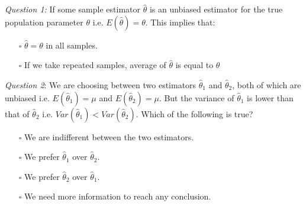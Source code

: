 \documentclass{./../../Latex/handout}
\begin{document}
\thispagestyle{plain}

 \\~\\

\textit{Question 1:} If some sample estimator $\hat{\theta}$ is an unbiased estimator for the true population parameter $\theta$ i.e. $E(\hat{\theta}) = \theta$. This implies that: \vspace{-1em}
\begin{itemize}
\item[$\square$] $\hat{\theta}=\theta$ in all samples.
\item[$\square$] If we take repeated samples, average of $\hat{\theta}$ is equal to $\theta$ \\
\end{itemize}

\textit{Question 2}: We are choosing between two estimators $\hat{\theta}_1$ and $\hat{\theta}_2$, both of which are unbiased i.e. $E(\hat{\theta}_1)=\mu$ and $E(\hat{\theta}_2)=\mu$. But the variance of $\hat{\theta}_1$ is lower than that of $\hat{\theta}_2$ i.e. $Var(\hat{\theta}_1)<Var(\hat{\theta}_2)$.  Which of the following is true? \vspace{-1em}
\begin{itemize}
\item[$\square$] We are indifferent between the two estimators.
\item[$\square$] We prefer $\hat{\theta}_1$ over $\hat{\theta}_2$.
\item[$\square$] We prefer $\hat{\theta}_2$ over $\hat{\theta}_1$.
\item[$\square$] We need more information to reach any conclusion. \\~\\
\end{itemize}
\end{document}
